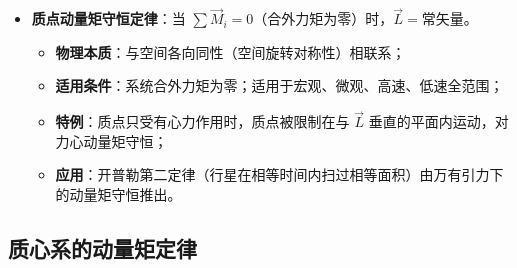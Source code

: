 \documentclass[12pt,a4paper]{ctexart}
\begin{document}
\begin{itemize}
\begin{itemize}
        \item 冲量矩是动量矩变化的原因，动量矩的变化是力矩对时间的累积结果。
    \end{itemize}
    \item \textbf{质点动量矩守恒定律}：当 $\sum \vec{M}_i = 0$（合外力矩为零）时，$\vec{L} = \text{常矢量}$。
    \begin{itemize}
        \item \textbf{物理本质}：与空间各向同性（空间旋转对称性）相联系；
        \item \textbf{适用条件}：系统合外力矩为零；适用于宏观、微观、高速、低速全范围；
        \item \textbf{特例}：质点只受有心力作用时，质点被限制在与 $\vec{L}$ 垂直的平面内运动，对力心动量矩守恒；
        \item \textbf{应用}：开普勒第二定律（行星在相等时间内扫过相等面积）由万有引力下的动量矩守恒推出。
    \end{itemize}
\end{itemize}

\subsection{质心系的动量矩定律}
\end{document}
